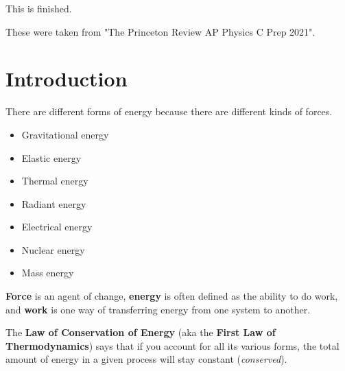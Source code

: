 \documentclass{article}
\begin{document}
\begin{finished}
    This is finished.
\end{finished}

\begin{note}
    These were taken from "The Princeton Review AP Physics C Prep 2021". 
\end{note}

\section{Introduction}
There are different forms of energy because there are different kinds of forces. 
\begin{itemize}
    \item Gravitational energy
    \item Elastic energy
    \item Thermal energy
    \item Radiant energy
    \item Electrical energy
    \item Nuclear energy
    \item Mass energy
\end{itemize}
\begin{definition}
    \textbf{Force} is an agent of change, \textbf{energy} is often defined as the ability to do work, and \textbf{work} is one way of transferring energy from one system to another.
\end{definition}
The \textbf{Law of Conservation of Energy} (aka the \textbf{First Law of Thermodynamics}) says that if you account for all its various forms, the total amount of energy in a given process will stay constant (\textit{conserved}).
\end{document}
